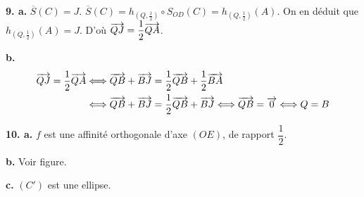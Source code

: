 \documentclass[11pt]{article}
\begin{document}
\textbf{9. a.} $\overline{S}(C) = J$. $\overline{S}(C) = h_{(Q,\frac{1}{2})} \circ S_{OD}(C) = h_{(Q,\frac{1}{2})}(A)$. On en déduit que $h_{(Q,\frac{1}{2})}(A) = J$. D'où $\overrightarrow{QJ} = \dfrac{1}{2}\overrightarrow{QA}$.

\textbf{b.}
\begin{align*}
\overrightarrow{QJ} = \frac{1}{2}\overrightarrow{QA} &\Longleftrightarrow \overrightarrow{QB} + \overrightarrow{BJ} = \frac{1}{2}\overrightarrow{QB} + \frac{1}{2}\overrightarrow{BA} \\
&\Longleftrightarrow \overrightarrow{QB} + \overrightarrow{BJ} = \frac{1}{2}\overrightarrow{QB} + \overrightarrow{BJ} \Longleftrightarrow \overrightarrow{QB} = \overrightarrow{0} \Longleftrightarrow Q = B
\end{align*}

\textbf{10. a.} $f$ est une affinité orthogonale d'axe $(OE)$, de rapport $\dfrac{1}{2}$.

\textbf{b.} Voir figure.

\textbf{c.} $(C')$ est une ellipse.
\end{document}
